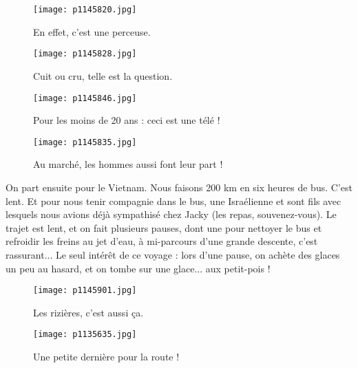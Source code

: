 \documentclass{book}
\begin{document}
\begin{figure}[h]
\centering
\texttt{[image: p1145820.jpg]}
\caption*{En effet, c'est une perceuse.}
\end{figure}


\begin{figure}[h]
\centering
\texttt{[image: p1145828.jpg]}
\caption*{Cuit ou cru, telle est la question.}
\end{figure}




\begin{figure}[h]
\centering
\texttt{[image: p1145846.jpg]}
\caption*{Pour les moins de 20 ans : ceci est une télé !}
\end{figure}


\begin{figure}[h]
\centering
\texttt{[image: p1145835.jpg]}
\caption*{Au marché, les hommes aussi font leur part !}
\end{figure}

On part ensuite pour le Vietnam. Nous faisons 200 km en six heures de bus. C'est lent. Et pour nous tenir compagnie dans le bus, une Israélienne et sont fils avec lesquels nous avions déjà sympathisé chez Jacky (les repas, souvenez-vous). Le trajet est lent, et on fait plusieurs pauses, dont une pour nettoyer le bus et refroidir les freins au jet d'eau, à mi-parcours d'une grande descente, c'est rassurant... Le seul intérêt de ce voyage : lors d'une pause, on achète des glaces un peu au hasard, et on tombe sur une glace... aux petit-pois !


\begin{figure}[h]
\centering
\texttt{[image: p1145901.jpg]}
\caption*{Les rizières, c'est aussi ça.}
\end{figure}


\begin{figure}[h]
\centering
\texttt{[image: p1135635.jpg]}
\caption*{Une petite dernière pour la route !}
\end{figure}
\end{document}
